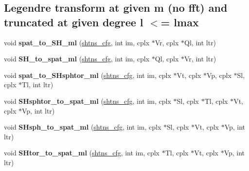 \subsection*{Legendre transform at given m (no fft) and truncated at given degree l $<$= lmax}
\begin{DoxyCompactItemize}
\item 
\hypertarget{group__sht_gac9ee9bc094595e1ef3f5de2afdb4b33a}{}void {\bfseries spat\+\_\+to\+\_\+\+S\+H\+\_\+ml} (\hyperlink{shtns_8h_ab7bd78e5cbeb4ed18782d018195fde00}{shtns\+\_\+cfg}, int im, cplx $\ast$Vr, cplx $\ast$Ql, int ltr)\label{group__sht_gac9ee9bc094595e1ef3f5de2afdb4b33a}

\item 
\hypertarget{group__sht_ga6ec6d0eb0332ec6e350747ee8072e832}{}void {\bfseries S\+H\+\_\+to\+\_\+spat\+\_\+ml} (\hyperlink{shtns_8h_ab7bd78e5cbeb4ed18782d018195fde00}{shtns\+\_\+cfg}, int im, cplx $\ast$Ql, cplx $\ast$Vr, int ltr)\label{group__sht_ga6ec6d0eb0332ec6e350747ee8072e832}

\item 
\hypertarget{group__sht_ga82acccde540cc820c1886b61569c069a}{}void {\bfseries spat\+\_\+to\+\_\+\+S\+Hsphtor\+\_\+ml} (\hyperlink{shtns_8h_ab7bd78e5cbeb4ed18782d018195fde00}{shtns\+\_\+cfg}, int im, cplx $\ast$Vt, cplx $\ast$Vp, cplx $\ast$Sl, cplx $\ast$Tl, int ltr)\label{group__sht_ga82acccde540cc820c1886b61569c069a}

\item 
\hypertarget{group__sht_ga66775a6624aedb0c3f9b49aff5ea6aa9}{}void {\bfseries S\+Hsphtor\+\_\+to\+\_\+spat\+\_\+ml} (\hyperlink{shtns_8h_ab7bd78e5cbeb4ed18782d018195fde00}{shtns\+\_\+cfg}, int im, cplx $\ast$Sl, cplx $\ast$Tl, cplx $\ast$Vt, cplx $\ast$Vp, int ltr)\label{group__sht_ga66775a6624aedb0c3f9b49aff5ea6aa9}

\item 
\hypertarget{group__sht_ga6bf82b2190005834236c03688e32a4e2}{}void {\bfseries S\+Hsph\+\_\+to\+\_\+spat\+\_\+ml} (\hyperlink{shtns_8h_ab7bd78e5cbeb4ed18782d018195fde00}{shtns\+\_\+cfg}, int im, cplx $\ast$Sl, cplx $\ast$Vt, cplx $\ast$Vp, int ltr)\label{group__sht_ga6bf82b2190005834236c03688e32a4e2}

\item 
\hypertarget{group__sht_ga243ec35f6cbe90fa703283d24679d968}{}void {\bfseries S\+Htor\+\_\+to\+\_\+spat\+\_\+ml} (\hyperlink{shtns_8h_ab7bd78e5cbeb4ed18782d018195fde00}{shtns\+\_\+cfg}, int im, cplx $\ast$Tl, cplx $\ast$Vt, cplx $\ast$Vp, int ltr)\label{group__sht_ga243ec35f6cbe90fa703283d24679d968}


\end{DoxyCompactItemize}
